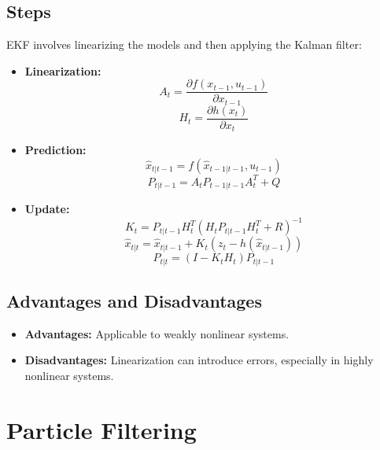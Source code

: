 \documentclass{article}
\begin{document}
\subsection{Steps}
EKF involves linearizing the models and then applying the Kalman filter:
\begin{itemize}
    \item \textbf{Linearization:} 
    \begin{equation}
    A_t = \frac{\partial f(x_{t-1}, u_{t-1})}{\partial x_{t-1}}
    \end{equation}
    \begin{equation}
    H_t = \frac{\partial h(x_t)}{\partial x_t}
    \end{equation}
    
    \item \textbf{Prediction:} 
    \begin{equation}
    \hat{x}_{t|t-1} = f(\hat{x}_{t-1|t-1}, u_{t-1})
    \end{equation}
    \begin{equation}
    P_{t|t-1} = A_t P_{t-1|t-1} A_t^T + Q
    \end{equation}
    
    \item \textbf{Update:} 
    \begin{equation}
    K_t = P_{t|t-1} H_t^T (H_t P_{t|t-1} H_t^T + R)^{-1}
    \end{equation}
    \begin{equation}
    \hat{x}_{t|t} = \hat{x}_{t|t-1} + K_t (z_t - h(\hat{x}_{t|t-1}))
    \end{equation}
    \begin{equation}
    P_{t|t} = (I - K_t H_t) P_{t|t-1}
    \end{equation}
\end{itemize}

\subsection{Advantages and Disadvantages}
\begin{itemize}
    \item \textbf{Advantages:} Applicable to weakly nonlinear systems.
    \item \textbf{Disadvantages:} Linearization can introduce errors, especially in highly nonlinear systems.
\end{itemize}

\section{Particle Filtering}
\end{document}
